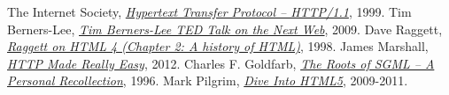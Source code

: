 
\begin{thebibliography}{99}

  The Internet Society,
  \emph{\href{http://tools.ietf.org/html/rfc2616}{Hypertext Transfer Protocol -- HTTP/1.1}},  
  1999.
  Tim Berners-Lee,
  \emph{\href{http://www.ted.com/talks/tim_berners_lee_on_the_next_web?language=en}{Tim Berners-Lee TED Talk on the Next Web}},  
  2009.
  Dave Raggett,
  \emph{\href{http://www.w3.org/People/Raggett/book4/ch02.html}{Raggett on HTML 4 (Chapter 2: A history of HTML)}},  
  1998.
  James Marshall,
  \emph{\href{http://www.jmarshall.com/easy/http/}{HTTP Made Really Easy}},  
  2012.
Charles F. Goldfarb,
\emph{\href{http://www.sgmlsource.com/history/roots.htm}{The Roots of SGML -- A Personal Recollection}},  
1996.
Mark Pilgrim,
\emph{\href{http://diveintohtml5.info/index.html}{Dive Into HTML5}},  
2009-2011.
\end{thebibliography}